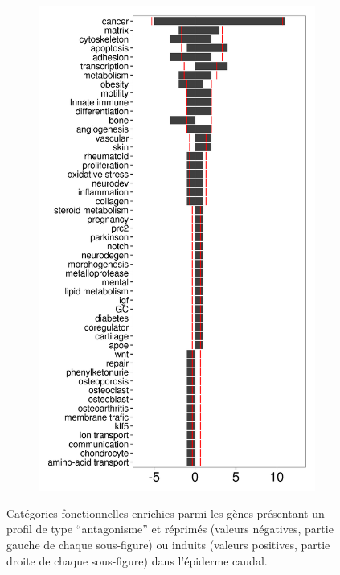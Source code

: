 \begin{figure}[!htbp]
\begin{subfigure}{0.49\textwidth}
	\includegraphics[width=\textwidth]
	{Figures/tfc-manualannot-antago/tfc-manualannot-antago-t.png}
	\caption{}
	\label{subfig:tfc-manualannot-antago-t}
\end{subfigure}
\caption[Catégories fonctionnelles enrichies parmi les gènes ``antagonisés'' dans l'épiderme caudal]
{
Catégories fonctionnelles enrichies parmi les gènes présentant un profil de type ``antagonisme'' et réprimés (valeurs négatives, partie gauche de chaque sous-figure) ou induits (valeurs positives, partie droite de chaque sous-figure) dans l'épiderme caudal.
}
\end{figure}
